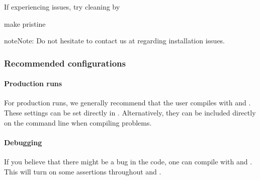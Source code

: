 \documentclass[letterpaper,10pt,english]{sphinxmanual}
\begin{document}
If experiencing issues, try cleaning  by

\begin{sphinxVerbatim}[commandchars=\\\{\},formatcom=\scriptsize]
 
make pristine
\end{sphinxVerbatim}

\begin{sphinxadmonition}{note}{Note:}
Do not hesitate to contact us at  regarding installation issues.
\end{sphinxadmonition}


\subsubsection{Recommended configurations}
\label{\detokenize{Base/GettingStarted:recommended-configurations}}

\paragraph{Production runs}
\label{\detokenize{Base/GettingStarted:production-runs}}
For production runs, we generally recommend that the user compiles with  and .
These settings can be set directly in .
Alternatively, they can be included directly on the command line when compiling problems.


\paragraph{Debugging}
\label{\detokenize{Base/GettingStarted:debugging}}
If you believe that there might be a bug in the code, one can compile with  and .
This will turn on some assertions throughout  and .
\end{document}
